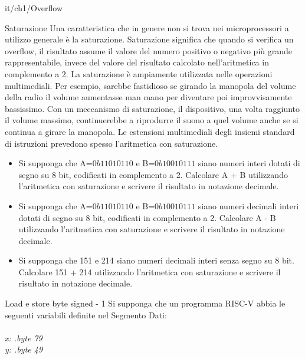 \documentclass[11pt]{article}
\begin{document}
\begin{quiz}{it/ch1/Overflow}
\begin{cloze}[points=1,shuffle=false]{Saturazione}
Una caratteristica che in genere non si trova nei microprocessori a utilizzo generale è la saturazione. Saturazione significa che quando si verifica un overflow, il risultato assume il valore del numero positivo o negativo più grande rappresentabile, invece del valore del risultato calcolato nell'aritmetica in complemento a 2. La saturazione è ampiamente utilizzata nelle operazioni multimediali. Per esempio, sarebbe fastidioso se girando la manopola del volume della radio il volume aumentasse man mano per diventare poi improvvisamente bassissimo. Con un meccanismo di saturazione, il dispositivo, una volta raggiunto il volume massimo, continuerebbe a riprodurre il suono a quel volume anche se si
continua a girare la manopola. Le estensioni multimediali degli insiemi standard di istruzioni prevedono spesso l'aritmetica con saturazione.

\begin{itemize}
    \item Si supponga che A=$0b11010110$ e B=$0b10010111$ siano numeri interi dotati di segno su 8 bit, codificati in complemento a 2. Calcolare A + B utilizzando l'aritmetica con saturazione e scrivere il risultato in notazione decimale.
    \item Si supponga che A=$0b11010110$ e B=$0b10010111$ siano numeri decimali interi dotati di segno su 8 bit, codificati in complemento a 2. Calcolare A - B utilizzando l'aritmetica con saturazione e scrivere il risultato in notazione decimale.
    \item Si supponga che 151 e 214 siano numeri decimali interi senza segno su 8 bit. Calcolare 151 + 214 utilizzando l'aritmetica con saturazione e scrivere il risultato in notazione decimale.
\end{itemize}
\end{cloze}

\begin{cloze}[points=1,shuffle=true]{Load e store byte signed - 1}
    Si supponga che un programma RISC-V abbia le seguenti variabili definite nel Segmento Dati:\\\\
    \emph{
        x: .byte 79 \\
        y: .byte 49 \\
    }\\\\
        

\end{cloze}
\end{quiz}
\end{document}
